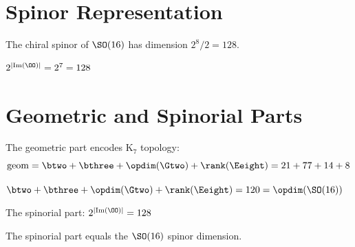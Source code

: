 \section{Spinor Representation}

\begin{definition}[SO(16) Spinor]\label{def:spinor_SO16}
    \leanok
    The chiral spinor of $\SO(16)$ has dimension $2^8/2 = 128$.
\end{definition}

\begin{theorem}\label{thm:spinor_from_octonions}
    \leanok
    $2^{|\mathrm{Im}(\OO)|} = 2^7 = 128$
\end{theorem}

\section{Geometric and Spinorial Parts}

\begin{definition}\label{def:geometric_part}
    \leanok
    The geometric part encodes K$_7$ topology:
    \[
        \mathrm{geom} = \btwo + \bthree + \opdim(\Gtwo) + \rank(\Eeight) = 21 + 77 + 14 + 8
    \]
\end{definition}

\begin{theorem}[Geometric = SO(16)]\label{thm:geometric_is_SO16}
    \leanok
    $\btwo + \bthree + \opdim(\Gtwo) + \rank(\Eeight) = 120 = \opdim(\SO(16))$
\end{theorem}

\begin{definition}\label{def:spinorial_part}
    \leanok
    The spinorial part: $2^{|\mathrm{Im}(\OO)|} = 128$
\end{definition}

\begin{theorem}[Spinorial = 128]\label{thm:spinorial_is_128}
    \leanok
    The spinorial part equals the $\SO(16)$ spinor dimension.
\end{theorem}

